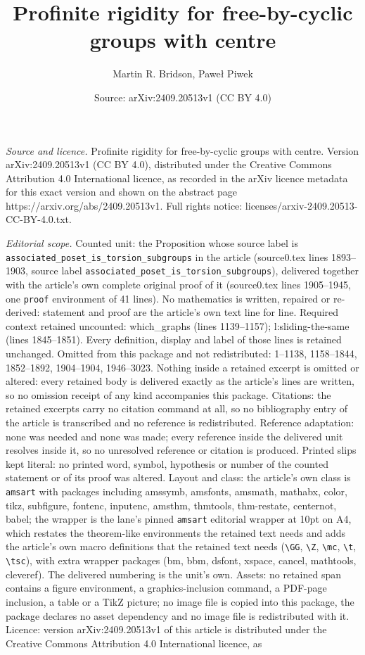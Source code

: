 \documentclass[10pt,a4paper]{amsart}
\title[Profinite rigidity for free-by-cyclic groups with centre]{Profinite rigidity for free-by-cyclic groups with centre}
\author{Martin R. Bridson, Pawe{\l} Piwek}
\date{Source: arXiv:2409.20513v1 (CC BY 4.0)}
\begin{document}
\maketitle

\noindent\emph{Source and licence.} Profinite rigidity for free-by-cyclic groups with centre. Version arXiv:2409.20513v1 (CC BY 4.0), distributed under the Creative Commons Attribution 4.0 International licence, as recorded in the arXiv licence metadata for this exact version and shown on the abstract page https://arxiv.org/abs/2409.20513v1. Full rights notice: licenses/arxiv-2409.20513-CC-BY-4.0.txt.\par\smallskip

\noindent\textit{Editorial scope.} Counted unit: the Proposition whose source label is \texttt{associated\_poset\_is\_torsion\_subgroups} in the article (source0.tex lines 1893--1903, source label \texttt{associated\_poset\_is\_torsion\_subgroups}), delivered together with the article's own complete original proof of it (source0.tex lines 1905--1945, one \texttt{proof} environment of 41 lines). No mathematics is written, repaired or re-derived: statement and proof are the article's own text line for line. Required context retained uncounted: which\_graphs (lines 1139--1157); l:sliding-the-same (lines 1845--1851). Every definition, display and label of those lines is retained unchanged. Omitted from this package and not redistributed: 1--1138, 1158--1844, 1852--1892, 1904--1904, 1946--3023. Nothing inside a retained excerpt is omitted or altered: every retained body is delivered exactly as the article's lines are written, so no omission receipt of any kind accompanies this package. Citations: the retained excerpts carry no citation command at all, so no bibliography entry of the article is transcribed and no reference is redistributed. Reference adaptation: none was needed and none was made; every reference inside the delivered unit resolves inside it, so no unresolved reference or citation is produced. Printed slips kept literal: no printed word, symbol, hypothesis or number of the counted statement or of its proof was altered. Layout and class: the article's own class is \texttt{amsart} with packages including amssymb, amsfonts, amsmath, mathabx, color, tikz, subfigure, fontenc, inputenc, amsthm, thmtools, thm-restate, centernot, babel; the wrapper is the lane's pinned \texttt{amsart} editorial wrapper at 10pt on A4, which restates the theorem-like environments the retained text needs and adds the article's own macro definitions that the retained text needs (\texttt{\textbackslash GG}, \texttt{\textbackslash Z}, \texttt{\textbackslash mc}, \texttt{\textbackslash t}, \texttt{\textbackslash tsc}), with extra wrapper packages (bm, bbm, dsfont, xspace, cancel, mathtools, cleveref). The delivered numbering is the unit's own. Assets: no retained span contains a figure environment, a graphics-inclusion command, a PDF-page inclusion, a table or a TikZ picture; no image file is copied into this package, the package declares no asset dependency and no image file is redistributed with it. Licence: version arXiv:2409.20513v1 of this article is distributed under the Creative Commons Attribution 4.0 International licence, as 
\end{document}
